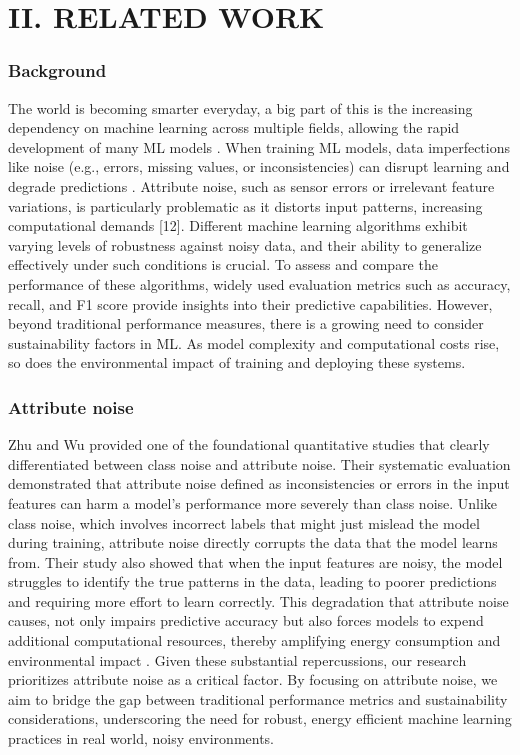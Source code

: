 \documentclass[conference]{IEEEtran}
\begin{document}
\section*{II. RELATED WORK}
\subsubsection*{Background} The world is becoming smarter everyday, a big part of this is the increasing dependency on machine learning across multiple fields, allowing the rapid development of many ML models \cite{bain_ai_sustainability}. When training ML models, data imperfections like noise (e.g., errors, missing values, or inconsistencies) can disrupt learning and degrade predictions \cite{sciencedirect_noise}. Attribute noise, such as sensor errors or irrelevant feature variations, is particularly problematic as it distorts input patterns, increasing computational demands [12]. Different machine learning algorithms exhibit varying levels of robustness against noisy data, and their ability to generalize effectively under such conditions is crucial. To assess and compare the performance of these algorithms, widely used evaluation metrics such as accuracy, recall, and F1 score provide insights into their predictive capabilities. However, beyond traditional performance measures, there is a growing need to consider sustainability factors in ML. As model complexity and computational costs rise, so does the environmental impact of training and deploying these systems. 
\newline
\newline
\subsubsection*{Attribute noise}
Zhu and Wu \cite{wuzu} provided one of the foundational quantitative studies that clearly differentiated between class noise and attribute noise. Their systematic evaluation demonstrated that attribute noise defined as inconsistencies or errors in the input features can harm a model's performance more severely than class noise. Unlike class noise, which involves incorrect labels that might just mislead the model during training, attribute noise directly corrupts the data that the model learns from. Their study also showed that when the input features are noisy, the model struggles to identify the true patterns in the data, leading to poorer predictions and requiring more effort to learn correctly.
\newline
\newline
This degradation that attribute noise causes, not only impairs predictive accuracy but also forces models to expend additional computational resources, thereby amplifying energy consumption and environmental impact \cite{wuzu}. Given these substantial repercussions, our research prioritizes attribute noise as a critical factor. By focusing on attribute noise, we aim to bridge the gap between traditional performance metrics and sustainability considerations, underscoring the need for robust, energy efficient machine learning practices in real world, noisy environments.
\end{document}
